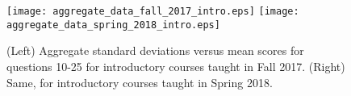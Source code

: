 \documentclass[../../main.tex]{subfiles}
\begin{document}
\begin{figure}
\centering
\texttt{[image: aggregate\_data\_fall\_2017\_intro.eps]}
\texttt{[image: aggregate\_data\_spring\_2018\_intro.eps]}
\caption{\label{fig:ag_data} (Left) Aggregate standard deviations versus mean scores for questions 10-25 for introductory courses taught in Fall 2017.  (Right) Same, for introductory courses taught in Spring 2018.}
\end{figure}
\end{document}
